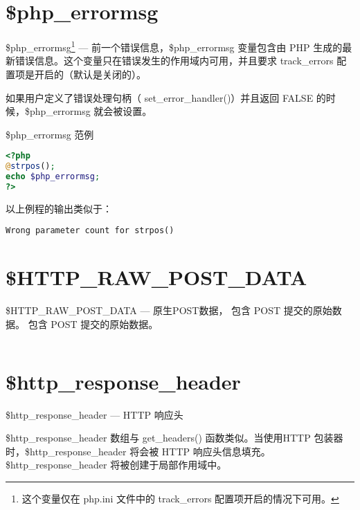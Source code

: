 \section{\$php\_errormsg}

\$php\_errormsg\footnote{这个变量仅在 php.ini 文件中的 track\_errors 配置项开启的情况下可用。} — 前一个错误信息，\$php\_errormsg 变量包含由 PHP 生成的最新错误信息。这个变量只在错误发生的作用域内可用，并且要求 track\_errors 配置项是开启的（默认是关闭的）。

如果用户定义了错误处理句柄（ set\_error\_handler()）并且返回 FALSE 的时候，\$php\_errormsg 就会被设置。


\begin{example}
\$php\_errormsg 范例
\begin{lstlisting}[language=PHP]
<?php
@strpos();
echo $php_errormsg;
?>
\end{lstlisting}
\end{example}

以上例程的输出类似于：

\begin{verbatim}
Wrong parameter count for strpos()
\end{verbatim}






\section{\$HTTP\_RAW\_POST\_DATA}


\$HTTP\_RAW\_POST\_DATA — 原生POST数据， 包含 POST 提交的原始数据。 包含 POST 提交的原始数据。

\begin{example}

\begin{lstlisting}[language=PHP]

\end{lstlisting}
\end{example}

\section{\$http\_response\_header}



\$http\_response\_header — HTTP 响应头

\$http\_response\_header 数组与 get\_headers() 函数类似。当使用HTTP 包装器时，\$http\_response\_header 将会被 HTTP 响应头信息填充。\$http\_response\_header 将被创建于局部作用域中。



